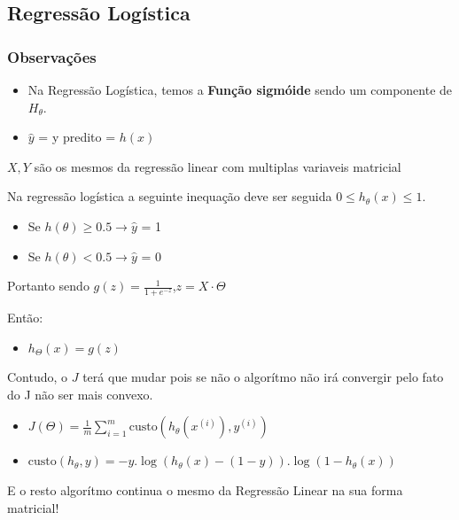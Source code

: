 \documentclass[11pt]{article}
\providecommand{\tightlist}{%
      \setlength{\itemsep}{0pt}\setlength{\parskip}{0pt}}
\def\lt{<}
\begin{document}
    \hypertarget{regressuxe3o-loguxedstica}{%
\subsection{\texorpdfstring{\textbf{Regressão
Logística}}{Regressão Logística}}\label{regressuxe3o-loguxedstica}}

\hypertarget{observauxe7uxf5es}{%
\subsubsection{Observações}\label{observauxe7uxf5es}}

\begin{itemize}
\item
  Na Regressão Logística, temos a
  \textbf{Função sigmóide}
  sendo um componente de $H_{\theta}$.
\item
  \(\hat y\) = y predito = \(h(x)\)
\end{itemize}

\(X,Y\) são os mesmos da regressão linear com multiplas variaveis
matricial

Na regressão logística a seguinte inequação deve ser seguida
\(0 \leq h_\theta(x) \leq 1\).

\begin{itemize}
\item
  Se \(h(\theta) \geq 0.5 \to \hat y\) = 1
\item
  Se \(h(\theta) \lt 0.5 \to \hat y\) = 0
\end{itemize}

Portanto sendo \(g(z)=\frac{1}{1+e^{-z}}\),\(z=X\cdot\Theta\)

Então:

\begin{itemize}
\tightlist
\item
  \(h_\Theta(x)=g(z)\)
\end{itemize}

Contudo, o \(J\) terá que mudar pois se não o algorítmo não irá
convergir pelo fato do J não ser mais convexo.

\begin{itemize}
\item
  \(J(\Theta)=\frac{1}{m}\sum\limits_{i=1}^{m}\text{custo}(h_\theta(x^{(i)}),y^{(i)})\)
\item
  \(\text{custo}(h_{\theta},y)=-y.\log(h_{\theta}(x)-(1-y)).\log(1-h_{\theta}(x))\)
\end{itemize}

E o resto algorítmo continua o mesmo da Regressão Linear na sua forma
matricial!
\end{document}
